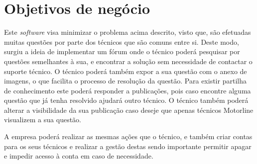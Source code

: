 \section{Objetivos de negócio}

Este \textit{software} visa minimizar o problema acima descrito, visto que, são efetuadas muitas questões por parte dos técnicos que são comuns entre si. Deste modo, surgiu a ideia de implementar um fórum onde o técnico poderá pesquisar por questões semelhantes à sua, e encontrar a solução sem necessidade de contactar o suporte técnico. O técnico poderá também expor a sua questão com o anexo de imagens, o que facilita o processo de resolução da questão. Para existir partilha de conhecimento este poderá responder a publicações, pois caso encontre alguma questão que já tenha resolvido ajudará outro técnico. O técnico também poderá alterar a visibilidade da sua publicação caso deseje que apenas técnicos Motorline visualizem a sua questão.

A empresa poderá realizar as mesmas ações que o técnico, e também criar contas para os seus técnicos e realizar a gestão destas sendo importante permitir apagar e impedir acesso à conta em caso de necessidade.
